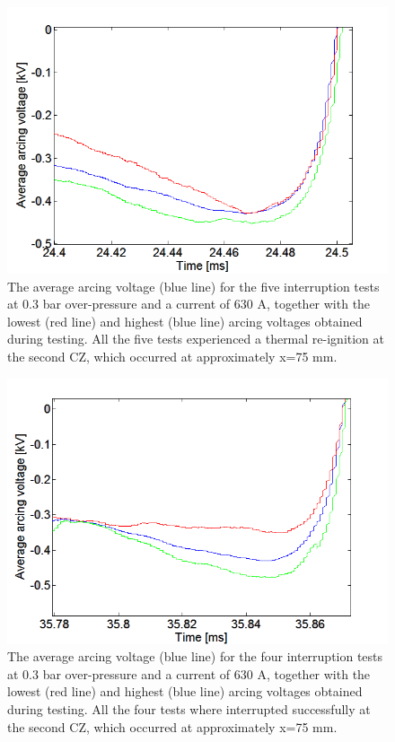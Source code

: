 \documentclass[10pt,b5paper,twoside]{article}
\begin{document}
\begin{figure}[H]
\centering
\includegraphics[scale=0.6, angle =0 ]{Bilder/Results/ArcingVoltage_75_reIgnition_average.PNG}
\caption{The average arcing voltage (blue line) for the five interruption tests at 0.3 bar over-pressure and a current of 630 A, together with the lowest (red line) and highest (blue line) arcing voltages obtained during testing. All the five tests experienced a thermal re-ignition at the second CZ, which occurred at approximately  x=75 mm.} \label{fig:75mmUnSuccessful_ave}
\end{figure}

\begin{figure}[H]
\centering
\includegraphics[scale=0.6, angle =0 ]{Bilder/Results/ArcingVoltage_75_none_reIgnition_average.PNG}
\caption{The average arcing voltage (blue line) for the four interruption tests at 0.3 bar over-pressure and a current of 630 A, together with the lowest (red line) and highest (blue line) arcing voltages obtained during testing. All the four tests where interrupted successfully at the second CZ, which occurred at approximately  x=75 mm.} \label{fig:75mmSuccessful_ave}
\end{figure}
\end{document}
